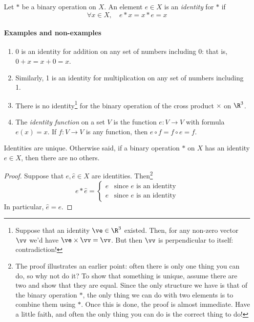 \begin{defn}
Let $*$ be a binary operation on $X$. An element $e\in X$ is an \emph{identity} for $*$ if
\[\forall x\in X,\quad e*x=x*e=x\]
\end{defn}

\paragraph{Examples and non-examples}
\begin{enumerate}
  \item 0 is an identity for addition on any set of numbers including 0: that is, $0+x=x+0=x$.
  \item Similarly, 1 is an identity for multiplication on any set of numbers including 1.
  \item There is no identity\footnote{Suppose that an identity $\ve\in\R^3$ existed. Then, for any non-zero vector $\vv$ we'd have $\ve\times\vv=\vv$. But then $\vv$ is perpendicular to itself: contradiction!} for the binary operation of the cross product $\times$ on $\R^3$.
  \item The \emph{identity function} on a set $V$ is the function $e:V\to V$ with formula $e(x)=x$. If $f:V\to V$ is any function, then $e\circ f=f\circ e=f$.
\end{enumerate}

\begin{thm}\label{thm:idunique}
Identities are unique. Otherwise said, if a binary operation $*$ on $X$ has an identity $e\in X$, then there are no others.
\end{thm}

\begin{proof}
Suppose that $e,\hat e\in X$ are identities. Then\footnote{The proof illustrates an earlier point: often there is only one thing you can do, so why not do it? To show that something is unique, assume there are two and show that they are equal. Since the only structure we have is that of the binary operation $*$, the only thing we can do with two elements is to combine them using $*$. Once this is done, the proof is almost immediate. Have a little faith, and often the only thing you can do is the correct thing to do!}
\[e*\hat e=\begin{cases}
\hat e&\text{since $e$ is an identity}\\
e&\text{since $\hat e$ is an identity}
\end{cases}\]
In particular, $\hat e=e$.
\end{proof}

